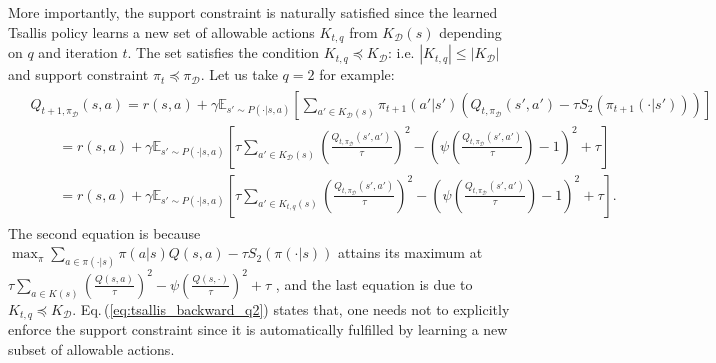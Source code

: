 \documentclass{article}
\newcommand{\AdaBracket}[1]{\left(#1\right)}
\newcommand{\AdaRectBracket}[1]{\left[#1\right]}
\newcommand{\expectation}[2]{\mathbb{E}_{#1}\AdaRectBracket{#2}}
\newcommand{\eq}[1]{Eq.\,(#1)}
\newcommand{\datasetOptimalQ}{Q_{*, \pi_{\mathcal{D}}}}
\newcommand{\datasetPolicy}{\pi_{\mathcal{D}}}
\begin{document}
More importantly, the support constraint is naturally satisfied since 
the learned Tsallis policy learns a new set of allowable actions $K_{t, q}$ from $K_\mathcal{D}(s)$ depending on $q$ and iteration $t$.
The set satisfies the condition $K_{t, q} \preceq K_\mathcal{D}$:
 i.e. $|K_{t, q}| \leq |K_\mathcal{D}|$ and support constraint $\pi_t \preceq \datasetPolicy$.
 Let us take $q=2$ for example:
 \begin{align}
    \begin{split}
    &Q_{t+1, \datasetPolicy}(s,a) = r(s,a) +  \gamma \expectation{s'\sim P(\cdot | s,a)}{ \sum_{a' \in K_{\mathcal{D}}(s)} \!\!\!\!\! \pi_{t+1}(a'|s') \AdaBracket{Q_{t, \datasetPolicy}(s',a') - \tau S_2(\pi_{t+1}(\cdot|s'))}}\\
    &\qquad = r(s,a) + \gamma \expectation{s'\sim P(\cdot | s,a)}{ \tau\sum_{a' \in K_{\mathcal{D}}(s)} \!\! \AdaBracket{\frac{Q_{t, \datasetPolicy}(s',a')}{\tau}}^2 - \AdaBracket{ \psi\AdaBracket{\frac{Q_{t, \datasetPolicy}(s',a')}{\tau}} - 1 }^2 + \tau}\\
    &\qquad = r(s,a) + \gamma \expectation{s'\sim P(\cdot | s,a)}{ \tau\sum_{a' \in K_{t,q}(s)} \!\! \AdaBracket{\frac{Q_{t, \datasetPolicy}(s',a')}{\tau}}^2 - \AdaBracket{ \psi\AdaBracket{\frac{Q_{t, \datasetPolicy}(s',a')}{\tau}} - 1 }^2 + \tau}.
    \end{split}
    \label{eq:tsallis_backward_q2}
 \end{align}
 The second equation is because $\max_{\pi}\sum_{a\in\pi(\cdot|s)}\pi(a|s)Q(s,a) - \tau S_2(\pi(\cdot|s))$ attains its maximum at $\tau \sum_{a \in K(s)}\AdaBracket{ \frac{Q(s,a)}{\tau} }^2 - \psi\AdaBracket{\frac{Q(s, \cdot)}{\tau}}^2 + \tau$ \cite{Lee2018-TsallisRAL,Martins16-sparsemax}, and the last equation is due to $K_{t, q} \preceq K_\mathcal{D}$.
 \eq{\ref{eq:tsallis_backward_q2}} states that, one needs not to explicitly enforce the support constraint since it is automatically fulfilled by learning a new subset of allowable actions.
\end{document}
